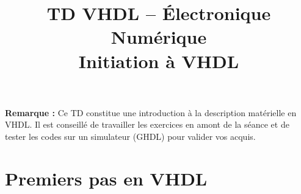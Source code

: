 \documentclass[a4paper,11pt]{article}
\title{\textcolor{primary}{\Huge\bfseries TD VHDL -- Électronique Numérique}\\[0.5em] \Large Initiation à VHDL}
\author{}
\date{}
\begin{document}
\maketitle
\thispagestyle{fancy}   %
\vspace{-2em}

\begin{notebox}
\textbf{Remarque :} Ce TD constitue une introduction à la description matérielle en VHDL. Il est conseillé de travailler les exercices en amont de la séance et de tester les codes sur un simulateur (GHDL) pour valider vos acquis.
\end{notebox}

\vspace{1em}

\section{Premiers pas en VHDL}
\end{document}
